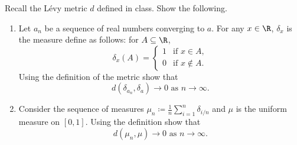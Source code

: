 \documentclass[12pt]{article}
\begin{document}
\begin{problem}
    Recall the L\'evy metric $d$ defined in class.
    Show the following.
    \begin{enumerate}
        \item Let $a_n$ be a sequence of real numbers converging to $a$.
        For any $x \in \R$, $\delta_x$ is the measure define as follows:
        for $A \subseteq \R$, \[
            \delta_x(A) = \begin{cases}
                1 & \text{if } x \in A, \\
                0 & \text{if } x \notin A.
            \end{cases}
        \] Using the definition of the metric show that \[
            d(\delta_{a_n}, \delta_a) \to 0 \text{ as } n \to \infty.
        \]
        \item Consider the sequence of measures
        $\mu_n \coloneq \frac1n \sum_{i=1}^n \delta_{i/n}$
        and $\mu$ is the uniform measure on $[0, 1]$.
        Using the definition show that
        \[
            d(\mu_n, \mu) \to 0 \text{ as } n \to \infty.
        \]
    \end{enumerate}
\end{problem}
\end{document}
